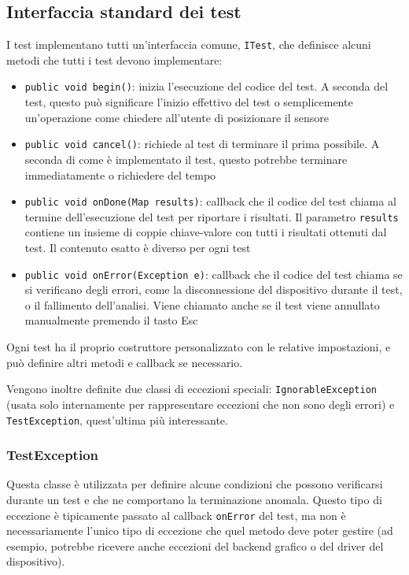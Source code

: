 \subsection{Interfaccia standard dei test}
I test implementano tutti un'interfaccia comune, \texttt{ITest}, che definisce alcuni metodi che tutti i test devono implementare:
\begin{itemize}
	\item \texttt{public void begin()}: inizia l'esecuzione del codice del test. A seconda del test, questo può significare l'inizio effettivo del test o semplicemente un'operazione come chiedere all'utente di posizionare il sensore
	\item \texttt{public void cancel()}: richiede al test di terminare il prima possibile. A seconda di come è implementato il test, questo potrebbe terminare immediatamente o richiedere del tempo
	\item \texttt{public void onDone(Map results)}: callback che il codice del test chiama al termine dell'esecuzione del test per riportare i risultati. Il parametro \texttt{results} contiene un insieme di coppie chiave-valore con tutti i risultati ottenuti dal test. Il contenuto esatto è diverso per ogni test
	\item \texttt{public void onError(Exception e)}: callback che il codice del test chiama se si verificano degli errori, come la disconnessione del dispositivo durante il test, o il fallimento dell'analisi. Viene chiamato anche se il test viene annullato manualmente premendo il tasto Esc
\end{itemize}

Ogni test ha il proprio costruttore personalizzato con le relative impostazioni, e può definire altri metodi e callback se necessario.

Vengono inoltre definite due classi di eccezioni speciali: \texttt{IgnorableException} (usata solo internamente per rappresentare eccezioni che non sono degli errori) e \texttt{TestException}, quest'ultima più interessante.

\subsubsection{TestException}
Questa classe è utilizzata per definire alcune condizioni che possono verificarsi durante un test e che ne comportano la terminazione anomala. Questo tipo di eccezione è tipicamente passato al callback \texttt{onError} del test, ma non è necessariamente l'unico tipo di eccezione che quel metodo deve poter gestire (ad esempio, potrebbe ricevere anche eccezioni del backend grafico o del driver del dispositivo).

